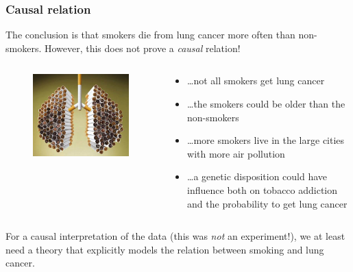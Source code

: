 \documentclass{beamer}
\begin{document}
\begin{frame}
  \frametitle{Causal relation}
  
  The conclusion is that smokers die from lung cancer more often than non-smokers. However, this does not prove a \emph{causal} relation!
\vfill  
  \begin{columns}
    \begin{column}{0.3 \textwidth}
      \begin{figure}
        \centering
          \includegraphics[width=1.00\textwidth]{img/les-6-smoking2.jpg}
      \end{figure}
    \end{column}
    \begin{column}{0.7 \textwidth}
      \begin{itemize}
        \item \dots not all smokers get lung cancer
        \item \dots the smokers could be older than the non-smokers
        \item \dots more smokers live in the large cities with more air pollution
        \item \dots a genetic disposition could have influence both on tobacco addiction and the probability to get lung cancer
      \end{itemize}
    \end{column}
  \end{columns}
\vfill
  For a causal interpretation of the data (this was \emph{not} an experiment!), we at least need a theory that explicitly models the relation between smoking and lung cancer.
\end{frame}
\end{document}
